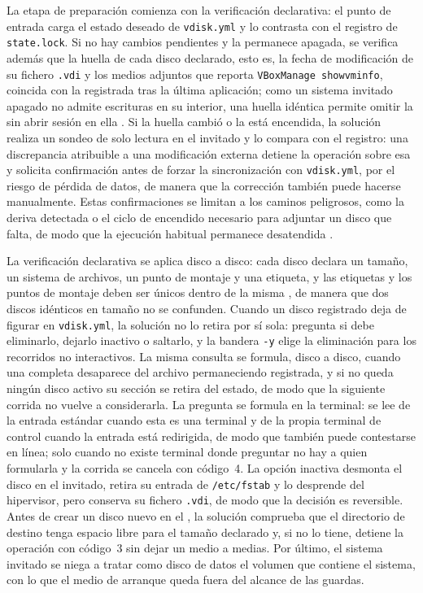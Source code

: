 La etapa de preparación comienza con la verificación declarativa: el punto de entrada carga el estado deseado de \texttt{vdisk.yml} y lo contrasta con el registro de \texttt{state.lock}. Si no hay cambios pendientes y la \vm{} permanece apagada, se verifica además que la huella de cada disco declarado, esto es, la fecha de modificación de su fichero \texttt{.vdi} y los medios adjuntos que reporta \texttt{VBoxManage showvminfo}, coincida con la registrada tras la última aplicación; como un sistema invitado apagado no admite escrituras en su interior, una huella idéntica permite omitir la \vm{} sin abrir sesión en ella \parencite{idempotency_concept}. Si la huella cambió o la \vm{} está encendida, la solución realiza un sondeo de solo lectura en el invitado y lo compara con el registro: una discrepancia atribuible a una modificación externa detiene la operación sobre esa \vm{} y solicita confirmación antes de forzar la sincronización con \texttt{vdisk.yml}, por el riesgo de pérdida de datos, de manera que la corrección también puede hacerse manualmente. Estas confirmaciones se limitan a los caminos peligrosos, como la deriva detectada o el ciclo de encendido necesario para adjuntar un disco que falta, de modo que la ejecución habitual permanece desatendida \parencite{virtualbox_vboxmanage}.

La verificación declarativa se aplica disco a disco: cada disco declara un tamaño, un sistema de archivos, un punto de montaje y una etiqueta, y las etiquetas y los puntos de montaje deben ser únicos dentro de la misma \vm{}, de manera que dos discos idénticos en tamaño no se confunden. Cuando un disco registrado deja de figurar en \texttt{vdisk.yml}, la solución no lo retira por sí sola: pregunta si debe eliminarlo, dejarlo inactivo o saltarlo, y la bandera \texttt{-y} elige la eliminación para los recorridos no interactivos. La misma consulta se formula, disco a disco, cuando una \vm{} completa desaparece del archivo permaneciendo registrada, y si no queda ningún disco activo su sección se retira del estado, de modo que la siguiente corrida no vuelve a considerarla. La pregunta se formula en la terminal: se lee de la entrada estándar cuando esta es una terminal y de la propia terminal de control cuando la entrada está redirigida, de modo que también puede contestarse en línea; solo cuando no existe terminal donde preguntar no hay a quien formularla y la corrida se cancela con código~4. La opción inactiva desmonta el disco en el invitado, retira su entrada de \texttt{/etc/fstab} y lo desprende del hipervisor, pero conserva su fichero \texttt{.vdi}, de modo que la decisión es reversible. Antes de crear un disco nuevo en el \host{}, la solución comprueba que el directorio de destino tenga espacio libre para el tamaño declarado y, si no lo tiene, detiene la operación con código~3 sin dejar un medio a medias. Por último, el sistema invitado se niega a tratar como disco de datos el volumen que contiene el sistema, con lo que el medio de arranque queda fuera del alcance de las guardas.

